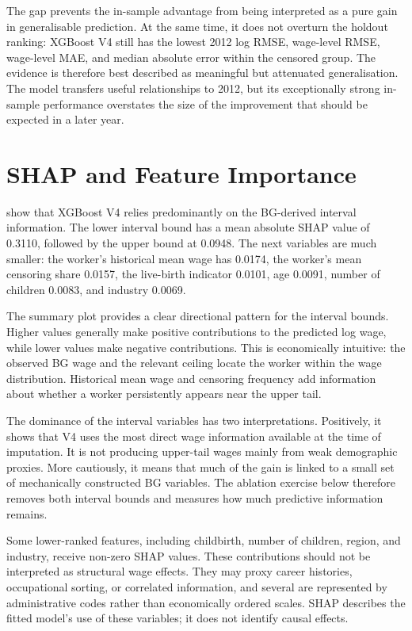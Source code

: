 \documentclass[12pt,a4paper,oneside,titlepage]{book}
\begin{document}
The gap prevents the in-sample advantage from being interpreted as a pure gain in generalisable prediction. At the same time, it does not overturn the holdout ranking: XGBoost V4 still has the lowest 2012 log RMSE, wage-level RMSE, wage-level MAE, and median absolute error within the censored group. The evidence is therefore best described as meaningful but attenuated generalisation. The model transfers useful relationships to 2012, but its exceptionally strong in-sample performance overstates the size of the improvement that should be expected in a later year.

\section{SHAP and Feature Importance}
 show that XGBoost V4 relies predominantly on the BG-derived interval information. The lower interval bound has a mean absolute SHAP value of 0.3110, followed by the upper bound at 0.0948. The next variables are much smaller: the worker's historical mean wage has 0.0174, the worker's mean censoring share 0.0157, the live-birth indicator 0.0101, age 0.0091, number of children 0.0083, and industry 0.0069.

The summary plot provides a clear directional pattern for the interval bounds. Higher values generally make positive contributions to the predicted log wage, while lower values make negative contributions. This is economically intuitive: the observed BG wage and the relevant ceiling locate the worker within the wage distribution. Historical mean wage and censoring frequency add information about whether a worker persistently appears near the upper tail.

The dominance of the interval variables has two interpretations. Positively, it shows that V4 uses the most direct wage information available at the time of imputation. It is not producing upper-tail wages mainly from weak demographic proxies. More cautiously, it means that much of the gain is linked to a small set of mechanically constructed BG variables. The ablation exercise below therefore removes both interval bounds and measures how much predictive information remains.

Some lower-ranked features, including childbirth, number of children, region, and industry, receive non-zero SHAP values. These contributions should not be interpreted as structural wage effects. They may proxy career histories, occupational sorting, or correlated information, and several are represented by administrative codes rather than economically ordered scales. SHAP describes the fitted model's use of these variables; it does not identify causal effects.
\end{document}
